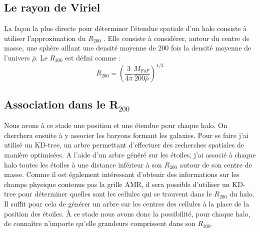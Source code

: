 \subsection{Le rayon de Viriel}
La façon la plus directe pour déterminer l'étendue spatiale d'un halo consiste à utiliser l'approximation du $R_{200}$ \citep{1997ApJ...490..493N}.
Elle consiste à considérer, autour du centre de masse, une sphère aillant une densité moyenne de $200$ fois la densité moyenne de l'univers $\bar{\rho}$.
Le $R_{200}$ est défini comme : 
\begin{equation}
R_{200}= \left( \frac{3}{4\pi} \frac{M_{FoF} }{200 \bar{\rho}}  \right)^{1/3}
\end{equation}


\subsection{Association dans le R$_{200}$}



%

Nous avons à ce stade une position et une étendue pour chaque halo.
On cherchera ensuite à y associer les baryons formant les galaxies.
Pour se faire j'ai utilisé un KD-tree, un arbre permettant d'effectuer des recherches spatiales de manière optimisées.
A l'aide d'un arbre généré sur les étoiles, j'ai associé à chaque halo toutes les étoiles à une distance inférieur à son $R_{200}$ autour de son centre de masse.
Comme il est également intéressant d'obtenir des informations sur les champs physique contenus pas la grille AMR, il sera possible d'utiliser un KD-tree pour déterminer quelles sont les cellules qui se trouvent dans le $R_{200}$ du halo.
Il suffit pour cela de générer un arbre sur les centres des cellules à la place de la position des étoiles.
À ce stade nous avons donc la possibilité, pour chaque halo, de connaître n'importe qu'elle grandeurs comprissent dans son $R_{200}$.


